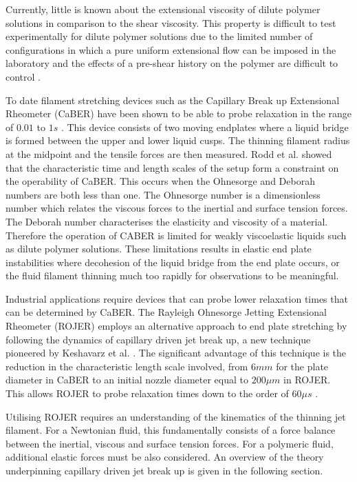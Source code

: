 \documentclass[11pt]{article}
\begin{document}
Currently, little is known about the extensional viscosity of dilute polymer solutions in comparison to the shear viscosity. This property is difficult to test experimentally for dilute polymer solutions due to the limited number of configurations in which a pure uniform extensional flow can be imposed in the laboratory and the effects of a pre-shear history on the polymer are difficult to control \cite{petrie2006extensional}.

To date filament stretching devices such as the Capillary Break up Extensional Rheometer (CaBER) have been shown to be able to probe relaxation in the range of $0.01$ to $1s$ \cite{bazilevsky1990liquid}. This device consists of two moving endplates where a liquid bridge is formed between the upper and lower liquid cusps. The thinning filament radius at the midpoint and the tensile forces are then measured. Rodd et al. \cite{rodd2004capillary} showed that the characteristic time and length scales of the setup form a constraint on the operability of CaBER. This occurs when the Ohnesorge and Deborah numbers are both less than one. The Ohnesorge number is a dimensionless number which relates the viscous forces to the inertial and surface tension forces. The Deborah number characterises the elasticity and viscosity of a material. Therefore the operation of CABER is limited for weakly viscoelastic liquids such as dilute polymer solutions. These limitations results in elastic end plate instabilities where decohesion of the liquid bridge from the end plate occurs, or the fluid filament thinning much too rapidly for observations to be meaningful. 

Industrial applications require devices that can probe lower relaxation times that can be determined by CaBER. The Rayleigh Ohnesorge Jetting Extensional Rheometer (ROJER) employs an alternative approach to end plate stretching by following the dynamics of capillary driven jet break up, a new technique pioneered by Keshavarz et al. \cite{keshavarz2015studying}. The significant advantage of this technique is the reduction in the characteristic length scale involved, from $6mm$ for the plate diameter in CaBER to an initial nozzle diameter equal to $200 \mu m$ in ROJER. This allows ROJER to probe relaxation times down to the order of $60 \mu s$ \cite{keshavarz2015studying}.

Utilising ROJER requires an understanding of the kinematics of the thinning jet filament. For a Newtonian fluid, this fundamentally consists of a force balance between the inertial, viscous and surface tension forces. For a polymeric fluid, additional elastic forces must be also considered. An overview of the theory underpinning capillary driven jet break up is given in the following section.
\end{document}
